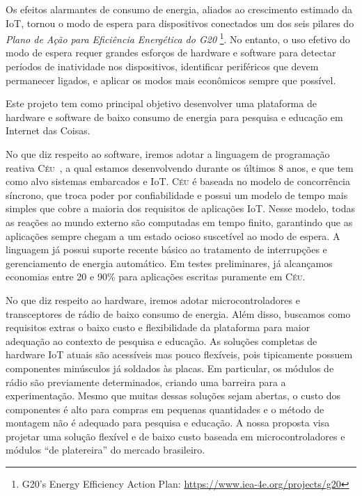 \documentclass[titlepage,12pt]{article}
\newcommand{\CEU}{\textsc{C\'{e}u}\xspace}
\begin{document}
Os efeitos alarmantes de consumo de energia, aliados ao crescimento estimado da
IoT, tornou o modo de espera para dispositivos conectados um dos seis pilares
do \emph{Plano de Ação para Eficiência Energética do G20}%
\footnote{G20's Energy Efficiency Action Plan: \url{https://www.iea-4e.org/projects/g20}}.
No entanto, o uso efetivo do modo de espera requer grandes esforços de hardware
e software para detectar períodos de inatividade nos dispositivos, identificar
periféricos que devem permanecer ligados, e aplicar os modos mais econômicos
sempre que possível.

Este projeto tem como principal objetivo desenvolver uma plataforma de hardware
e software de baixo consumo de energia para pesquisa e educação em Internet das
Coisas.

No que diz respeito ao software, iremos adotar a linguagem de programação
reativa \CEU~\cite{ceu.sensys13}, a qual estamos desenvolvendo durante os
últimos 8 anos, e que tem como alvo sistemas embarcados e IoT.
%
\CEU é baseada no modelo de concorrência síncrono, que troca poder por
confiabilidade e possui um modelo de tempo mais simples que cobre a maioria dos
requisitos de aplicações IoT.
%
Nesse modelo, todas as reações ao mundo externo são computadas em tempo finito,
garantindo que as aplicações sempre chegam a um estado ocioso suscetível ao
modo de espera.
%
A linguagem já possui suporte recente básico ao tratamento de interrupções e
gerenciamento de energia automático.
Em testes preliminares, já alcançamos economias entre 20 e 90\% para aplicações
escritas puramente em \CEU.

No que diz respeito ao hardware, iremos adotar microcontroladores e
transceptores de rádio de baixo consumo de energia.
Além disso, buscamos como requisitos extras o baixo custo e flexibilidade da
plataforma para maior adequação ao contexto de pesquisa e educação.
%
As soluções completas de hardware IoT atuais são acessíveis mas pouco
flexíveis, pois tipicamente possuem componentes minúsculos já soldados às
placas.
Em particular, os módulos de rádio são previamente determinados, criando uma
barreira para a experimentação.
Mesmo que muitas dessas soluções sejam abertas, o custo dos componentes é alto
para compras em pequenas quantidades e o método de montagem não é adequado para
pesquisa e educação.
%
A nossa proposta visa projetar uma solução flexível e de baixo custo baseada em
microcontroladores e módulos ``de platereira'' do mercado brasileiro.

\end{document}
